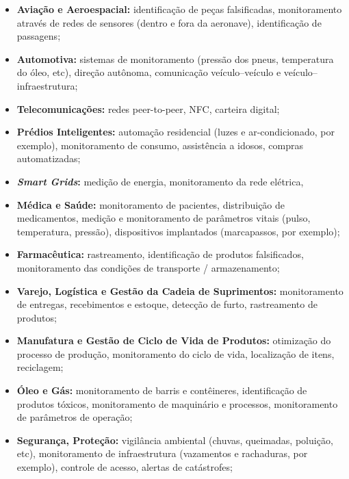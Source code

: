 \documentclass[twoside,english,brazilian]{UNISINOSmonografia}
\begin{document}
\begin{itemize}
	
	\item \textbf{Aviação e Aeroespacial:}
identificação de peças falsificadas, monitoramento através de redes de 
sensores (dentro e fora da aeronave), identificação de passagens;
	
	\item \textbf{Automotiva:}
sistemas de monitoramento (pressão dos pneus, temperatura do óleo, etc), 
direção autônoma, comunicação veículo--veículo e veículo--infraestrutura;
	
	\item \textbf{Telecomunicações:}
redes peer-to-peer, NFC, carteira digital;
	
	\item \textbf{Prédios Inteligentes:}
automação residencial (luzes e ar-condicionado, por exemplo), monitoramento de 
consumo, assistência a idosos, compras automatizadas;
	
	\item \textbf{\textit{Smart Grids}:}
medição de energia, monitoramento da rede elétrica,  
	
	\item \textbf{Médica e Saúde:}
monitoramento de pacientes, distribuição de medicamentos, medição e 
monitoramento de parâmetros vitais (pulso, temperatura, pressão), dispositivos 
implantados (marcapassos, por exemplo);
	
	\item \textbf{Farmacêutica:}
rastreamento, identificação de produtos falsificados, monitoramento das 
condições de transporte / armazenamento;
	
	\item \textbf{Varejo, Logística e Gestão da Cadeia de Suprimentos:}
monitoramento de entregas, recebimentos e estoque, detecção de furto, 
rastreamento de produtos;
	
	\item \textbf{Manufatura e Gestão de Ciclo de Vida de Produtos:}
otimização do processo de produção, monitoramento do ciclo de vida, 
localização de itens, reciclagem;
	
	\item \textbf{Óleo e Gás:}
monitoramento de barris e contêineres, identificação de produtos tóxicos, 
monitoramento de maquinário e processos, monitoramento de parâmetros de 
operação;
	
	\item \textbf{Segurança, Proteção:}
vigilância ambiental (chuvas, queimadas, poluição, etc), monitoramento de 
infraestrutura (vazamentos e rachaduras, por exemplo), controle de acesso, 
alertas de catástrofes;
	

\end{itemize}
\end{document}
